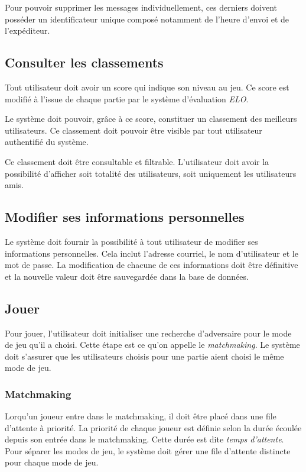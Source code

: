 Pour pouvoir supprimer les messages individuellement, ces
derniers doivent posséder un identificateur unique composé
notamment de l'heure d'envoi et de l'expéditeur.

\subsection{Consulter les classements}

Tout utilisateur doit avoir un score qui indique son niveau
au jeu. Ce score est modifié à l'issue de chaque partie
par le système d'évaluation \emph{ELO}.

Le système doit pouvoir, grâce à ce score, constituer
un classement des meilleurs utilisateurs. Ce classement doit
pouvoir être visible par tout utilisateur authentifié du système.

Ce classement doit être consultable et filtrable.
L'utilisateur doit avoir la possibilité d'afficher
soit totalité des utilisateurs, soit uniquement les utilisateurs
amis.

\subsection{Modifier ses informations personnelles}

Le système doit fournir la possibilité à tout utilisateur de
modifier ses informations personnelles. Cela inclut
l'adresse courriel, le nom d'utilisateur et le mot de passe.
La modification de chacune de ces informations doit être
définitive et la nouvelle valeur doit être
sauvegardée dans la base de données.

\subsection{Jouer}

Pour jouer, l'utilisateur doit initialiser une recherche
d'adversaire pour le mode de
jeu qu'il a choisi. Cette étape est ce qu'on appelle le
\emph{matchmaking}. Le système doit s'assurer que les
utilisateurs choisis pour une partie aient choisi le même
mode de jeu.

\subsubsection{Matchmaking}

Lorqu'un joueur entre dans le matchmaking, il doit être
placé dans une file d'attente à priorité.
La priorité de chaque joueur est définie selon la durée
écoulée
depuis son entrée dans le matchmaking. Cette durée est dite \emph{temps d'attente}.
Pour séparer les modes de jeu, le système doit gérer une
file d'attente distincte pour chaque mode de jeu.

